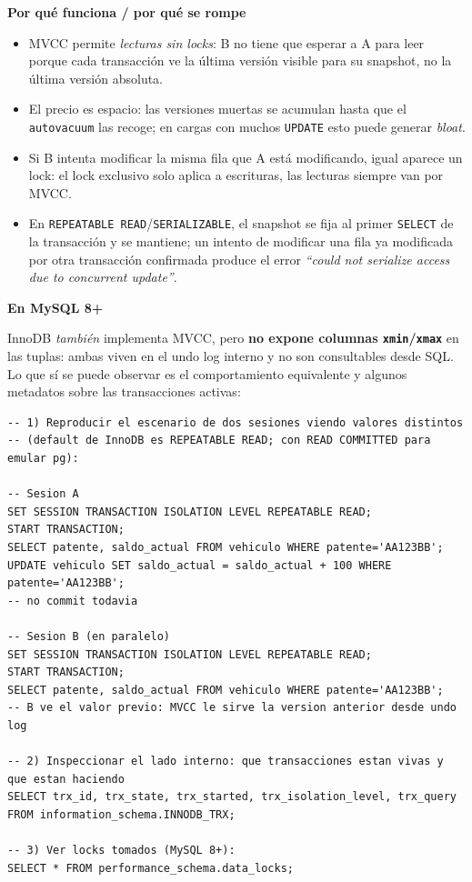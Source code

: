 \documentclass[11pt,a4paper]{article}
\newcommand{\itemcabecera}[1]{\noindent\textbf{#1}\par\medskip}
\newcommand{\bloquePorque}{\itemcabecera{Por qu\'e funciona / por qu\'e se rompe}}
\newcommand{\bloqueMySQL}{\itemcabecera{En MySQL 8+}}
\begin{document}
\bloquePorque

\begin{itemize}
    \item MVCC permite \emph{lecturas sin locks}: B no tiene que esperar a A para leer porque cada transacción ve la última versión visible para su snapshot, no la última versión absoluta.
    \item El precio es espacio: las versiones muertas se acumulan hasta que el \texttt{autovacuum} las recoge; en cargas con muchos \texttt{UPDATE} esto puede generar \emph{bloat}.
    \item Si B intenta modificar la misma fila que A está modificando, igual aparece un lock: el lock exclusivo solo aplica a escrituras, las lecturas siempre van por MVCC.
    \item En \texttt{REPEATABLE READ}/\texttt{SERIALIZABLE}, el snapshot se fija al primer \texttt{SELECT} de la transacción y se mantiene; un intento de modificar una fila ya modificada por otra transacción confirmada produce el error \emph{``could not serialize access due to concurrent update''}.
\end{itemize}

\bloqueMySQL

InnoDB \emph{también} implementa MVCC, pero \textbf{no expone columnas \texttt{xmin}/\texttt{xmax}} en las tuplas: ambas viven en el undo log interno y no son consultables desde SQL. Lo que sí se puede observar es el comportamiento equivalente y algunos metadatos sobre las transacciones activas:

\begin{lstlisting}
-- 1) Reproducir el escenario de dos sesiones viendo valores distintos
-- (default de InnoDB es REPEATABLE READ; con READ COMMITTED para emular pg):

-- Sesion A
SET SESSION TRANSACTION ISOLATION LEVEL REPEATABLE READ;
START TRANSACTION;
SELECT patente, saldo_actual FROM vehiculo WHERE patente='AA123BB';
UPDATE vehiculo SET saldo_actual = saldo_actual + 100 WHERE patente='AA123BB';
-- no commit todavia

-- Sesion B (en paralelo)
SET SESSION TRANSACTION ISOLATION LEVEL REPEATABLE READ;
START TRANSACTION;
SELECT patente, saldo_actual FROM vehiculo WHERE patente='AA123BB';
-- B ve el valor previo: MVCC le sirve la version anterior desde undo log

-- 2) Inspeccionar el lado interno: que transacciones estan vivas y que estan haciendo
SELECT trx_id, trx_state, trx_started, trx_isolation_level, trx_query
FROM information_schema.INNODB_TRX;

-- 3) Ver locks tomados (MySQL 8+):
SELECT * FROM performance_schema.data_locks;
\end{lstlisting}
\end{document}
